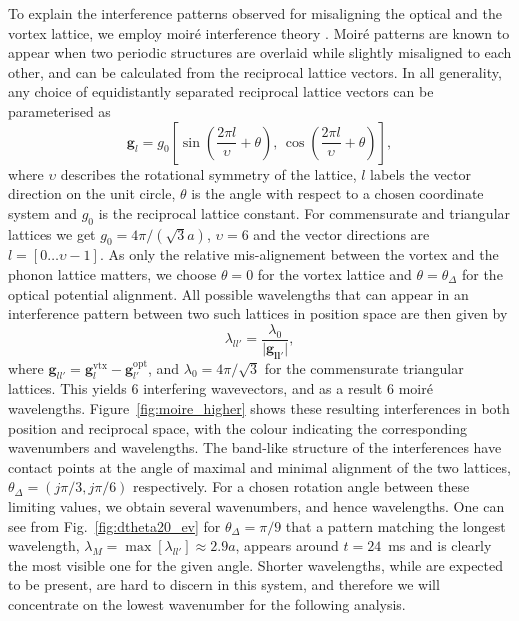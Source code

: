     To explain the interference patterns observed for misaligning the optical and the vortex lattice, we employ moir\'e interference theory \cite{SS:Hermann_jpcm_2012}. Moir\'e patterns are known to appear when two periodic structures are overlaid while slightly misaligned to each other, and can be calculated from the reciprocal lattice vectors. In all generality, any choice of equidistantly separated reciprocal lattice vectors can be parameterised as
    	\begin{equation}
    		\mathbf{g}_{l} = g_0 \left[ \sin\left( \frac{2\pi l}{\upsilon}+\theta \right),\, \cos\left( \frac{2\pi l}{\upsilon} +\theta\right) \right],
    	\end{equation}
    where $\upsilon$ describes the rotational symmetry of the lattice, $l$ labels the vector direction on the unit circle, $\theta$ is the angle with respect to a chosen coordinate system and $g_0$ is the reciprocal lattice constant. For commensurate and triangular lattices we get $g_0=4\pi/(\sqrt{3}a)$, $\upsilon=6$ and the vector directions are $l=\left[0\dots\upsilon-1\right]$. As only the relative mis-alignement between the vortex and the phonon lattice matters, we choose $\theta=0$ for the vortex lattice and $\theta=\theta_\Delta$ for the optical potential alignment.
    All possible wavelengths that can appear in an interference pattern between two such lattices in position space are then given by
    	\begin{equation}
    		\lambda_{ll'} = \frac{\lambda_0}{|\mathbf{\mathbf{g}_{ll'}|}},
    		\label{eq:InterferenceVectors}
    	\end{equation}
    where
    $\mathbf{g}_{ll'}=\mathbf{g}_{l}^{\text{vtx}}-\mathbf{g}_{l'}^{\text{opt}}$, and
    $\lambda_0 = 4\pi/\sqrt{3}$ for the commensurate triangular lattices. This yields 6 interfering wavevectors, and as a result 6 moir\'e wavelengths. Figure~\ref{fig:moire_higher} shows these resulting interferences in both position and reciprocal space, with the colour indicating the corresponding wavenumbers and wavelengths. The band-like structure of the interferences have contact points at the angle of maximal and minimal alignment of the two lattices, $\theta_\Delta=(j\pi/3,j\pi/6)$ respectively. For a chosen rotation angle between these limiting values, we obtain several wavenumbers, and hence wavelengths. One can see from Fig.~\ref{fig:dtheta20_ev} for $\theta_\Delta = \pi/9$ that a pattern matching the longest wavelength, $\lambda_M= \max[\lambda_{ll'}] \approx 2.9 a$, appears around $t=24$~ms and is clearly the most visible one for the given angle. Shorter wavelengths, while are expected to be present, are hard to discern in this system, and therefore we will concentrate on the lowest wavenumber for the following analysis.

